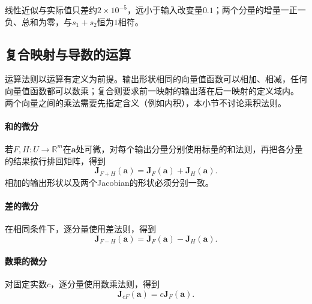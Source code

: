 线性近似与实际值只差约$2\times10^{-5}$，远小于输入改变量$0.1$；两个分量的增量一正一负、总和为零，与$s_1+s_2$恒为$1$相符。

\subsection{复合映射与导数的运算}
\label{sec:analysis-vector-chain-matrix-calculus}

运算法则以运算有定义为前提。输出形状相同的向量值函数可以相加、相减，任何向量值函数都可以数乘；复合则要求前一映射的输出落在后一映射的定义域内。
两个向量之间的乘法需要先指定含义（例如内积），本小节不讨论乘积法则。

\paragraph{和的微分}
若$F,H:U\to\mathbb R^m$在$\bm a$处可微，对每个输出分量分别使用标量的和法则，再把各分量的结果按行排回矩阵，得到
\[
 \bm J_{F+H}(\bm a)=\bm J_F(\bm a)+\bm J_H(\bm a).
\]
相加的输出形状以及两个Jacobian的形状必须分别一致。

\paragraph{差的微分}
在相同条件下，逐分量使用差法则，得到
\[
 \bm J_{F-H}(\bm a)=\bm J_F(\bm a)-\bm J_H(\bm a).
\]

\paragraph{数乘的微分}
对固定实数$c$，逐分量使用数乘法则，得到
\[
 \bm J_{cF}(\bm a)=c\bm J_F(\bm a).
\]

